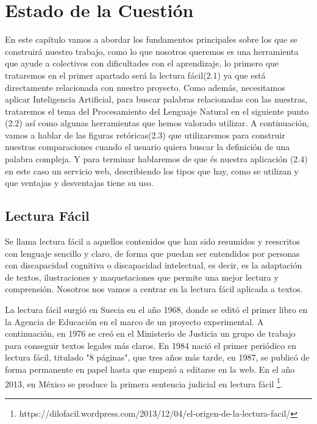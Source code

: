 \chapter{Estado de la Cuestión}
\label{cap:estadoDeLaCuestion}


	
	
En este capítulo vamos a abordar los fundamentos principales sobre los que se construirá nuestro trabajo, como lo que nosotros queremos es una herramienta que ayude a colectivos con dificultades con el aprendizaje, lo primero que trataremos en el primer apartado será la lectura fácil(2.1) ya que está directamente relacionada con nuestro proyecto. Como además, necesitamos aplicar Inteligencia Artificial, para buscar palabras relacionadas con las nuestras, trataremos el tema del Procesamiento del Lenguaje Natural en el siguiente punto (2.2) así como algunas herramientas que hemos valorado utilizar. A continuación, vamos a hablar de las figuras retóricas(2.3) que utilizaremos para construir nuestras comparaciones cuando el usuario quiera buscar la definición de una palabra compleja. Y para terminar hablaremos de que és nuestra aplicación (2.4) en este caso un servicio web, describiendo los tipos que hay, como se utilizan y que ventajas y desventajas tiene su uso.
	



\section{Lectura Fácil}
\label{cap:sec:lecturafacil}

Se llama lectura fácil a aquellos contenidos que han sido resumidos y reescritos con lenguaje sencillo y claro, de forma que puedan ser entendidos por personas con discapacidad cognitiva o discapacidad intelectual, es decir, es la adaptación de textos, ilustraciones y maquetaciones que permite una mejor lectura y comprensión.
Nosotros nos vamos a centrar en la lectura fácil aplicada a textos.

La lectura fácil surgió en Suecia en el año 1968, donde se editó el primer libro en la Agencia de Educación en el marco de un proyecto experimental. A continuación, en 1976 se creó en el Ministerio de Justicia un grupo de trabajo para conseguir textos legales más claros.
En 1984 nació el primer periódico en lectura fácil, titulado "8 páginas", que tres años más tarde, en 1987, se publicó de forma permanente en papel hasta que empezó a editarse en la web. 
En el año 2013, en México se produce la primera sentencia judicial en lectura fácil \footnote{https://dilofacil.wordpress.com/2013/12/04/el-origen-de-la-lectura-facil/}.

